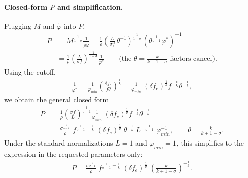 \begin{solution}
    \paragraph{Closed-form $P$ and simplification.} Plugging $M$ and $\tilde{\varphi}$ into $P$,
    \begin{align*}
        P &= M^{\frac{1}{1-\sigma}} \frac{1}{\rho \tilde{\varphi}}
        = \frac{1}{\rho}\left(\frac{L}{\sigma f}\,\theta^{-1}\right)^{\frac{1}{1-\sigma}}
           \left(\theta^{\frac{1}{\sigma-1}}\varphi^*\right)^{-1} \\
          &= \frac{1}{\rho}\left(\frac{L}{\sigma f}\right)^{\frac{1}{1-\sigma}}\frac{1}{\varphi^*}
          \qquad\text{(the $\theta=\frac{k}{k+1-\sigma}$ factors cancel).}
    \end{align*}
    Using the cutoff,
    \begin{align*}
        \frac{1}{\varphi^*} = \frac{1}{\varphi_{min}}\left(\frac{\delta f_e}{f\theta}\right)^{\frac{1}{k}}
        = \frac{1}{\varphi_{min}}\,(\delta f_e)^{\frac{1}{k}} f^{-\frac{1}{k}} \theta^{-\frac{1}{k}},
    \end{align*}
    we obtain the general closed form
    \begin{align*}
        P &= \frac{1}{\rho}\left(\frac{\sigma f}{L}\right)^{\frac{1}{\sigma-1}}
             \frac{1}{\varphi_{min}}\,
             (\delta f_e)^{\frac{1}{k}} f^{-\frac{1}{k}} \theta^{-\frac{1}{k}} \\[2pt]
          &= \frac{\sigma^{\frac{1}{\sigma-1}}}{\rho}\;
             f^{\frac{1}{\sigma-1}-\frac{1}{k}}\;
             (\delta f_e)^{\frac{1}{k}}\;
             \theta^{-\frac{1}{k}}\;
             L^{-\frac{1}{\sigma-1}}\;
             \varphi_{min}^{-1},
             \qquad \theta=\frac{k}{k+1-\sigma}.
    \end{align*}
    Under the standard normalizations $L=1$ and $\varphi_{min}=1$, this simplifies to the expression in the requested parameters only:
    \begin{align*}
        P = \frac{\sigma^{\frac{1}{\sigma-1}}}{\rho}\;
            f^{\frac{1}{\sigma-1}-\frac{1}{k}}\;
            (\delta f_e)^{\frac{1}{k}}\;
            \left(\frac{k}{k+1-\sigma}\right)^{-\frac{1}{k}}.
    \end{align*}
\end{solution}
